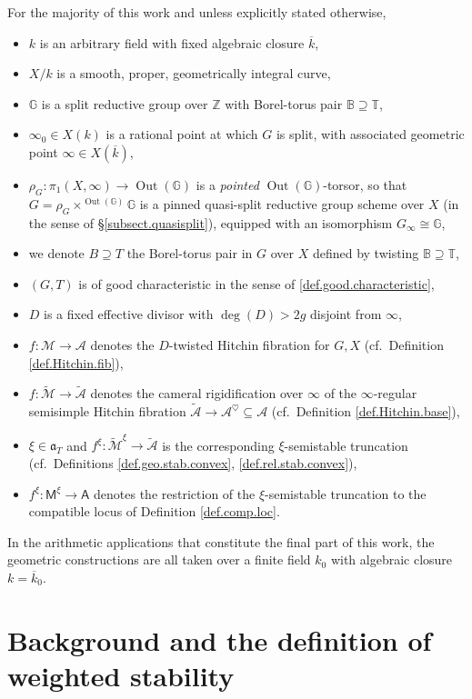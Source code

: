 \documentclass[openany]{amsbook}
\theoremstyle{definition}
\theoremstyle{remark}
\numberwithin{equation}{section}
\newcommand{\Z}{\mathbb{Z}}
\newcommand{\G}{\mathbb{G}}
\newcommand{\B}{\mathbb{B}}
\newcommand{\T}{\mathbb{T}}
\newcommand{\cA}{\mathcal{A}}
\newcommand{\cM}{\mathcal{M}}
\newcommand{\ol}[1]{\overline{#1}}
\renewcommand{\-}{\operatorname{-}}
\newcommand{\Out}{\operatorname{Out}}
\renewcommand{\a}{\mathfrak{a}}
\newcommand{\ctM}{\widetilde{\cM}}
\newcommand{\ctA}{\widetilde{\cA}}
\newcommand{\bM}{\mathsf{M}}
\newcommand{\bA}{\mathsf{A}}
\begin{document}
For the majority of this work and unless explicitly stated otherwise, 
\begin{itemize} 
\item $k$ is an arbitrary field with fixed algebraic closure $\ol{k}$, 
\item $X/k$ is a smooth, proper, geometrically integral curve, 
\item $\G$ is a split reductive group over $\Z$ with Borel-torus pair $\B \supseteq \T$,
\item $\infty_0 \in X(k)$ is a rational point at which $G$ is split, with associated geometric point $\infty \in X(\ol{k})$,
\item $\rho_G : \pi_1(X, \infty) \to \Out(\G)$ is a \emph{pointed} $\Out(\G)$-torsor, so that $G = \rho_G \times^{\Out(\G)} \G$ is a pinned quasi-split reductive group scheme over $X$ (in the sense of \S \ref{subsect.quasisplit}), equipped with an isomorphism $G_\infty \cong \G$,
\item we denote $B \supseteq T$ the Borel-torus pair in $G$ over $X$ defined by twisting $\B \supseteq \T$,
\item $(G, T)$ is of good characteristic in the sense of \ref{def.good.characteristic},
\item $D$ is a fixed effective divisor with $\deg(D) > 2g$ disjoint from $\infty$,
\item $f : \cM \to \cA$ denotes the $D$-twisted Hitchin fibration for $G, X$ (cf.\ Definition \ref{def.Hitchin.fib}),
\item $f : \ctM \to \ctA$ denotes the cameral rigidification over $\infty$ of the $\infty$-regular semisimple Hitchin fibration $\ctA \to \cA^{\heartsuit} \subseteq \cA$ (cf.\ Definition \ref{def.Hitchin.base}),
\item $\xi \in \a_T$ and $f^{\xi} : \ctM^{\xi} \to \ctA$ is the corresponding $\xi$-semistable truncation (cf.\ Definitions \ref{def.geo.stab.convex}, \ref{def.rel.stab.convex}),
\item $f^{\xi} : \bM^{\xi} \to \bA$ denotes the restriction of the $\xi$-semistable truncation to the compatible locus of Definition \ref{def.comp.loc}.
\end{itemize}
In the arithmetic applications that constitute the final part of this work, the geometric constructions are all taken over a finite field $k_0$ with algebraic closure $k = \ol{k}_0$. 





\part{Background and the definition of weighted stability}
\end{document}
